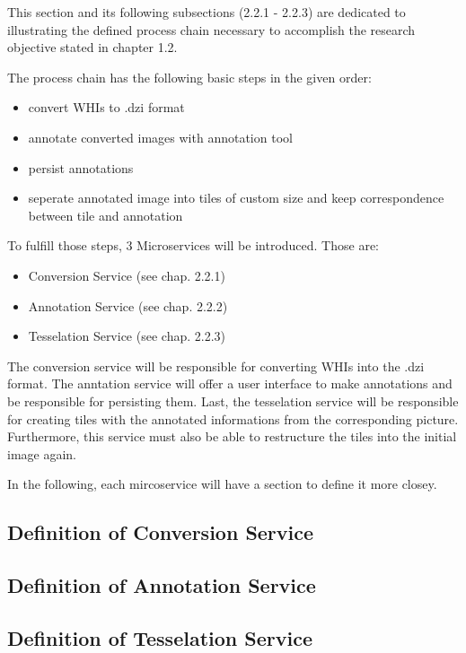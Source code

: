 This section and its following subsections (2.2.1 - 2.2.3) are dedicated to illustrating the defined process chain necessary to accomplish the research objective stated in chapter 1.2.

The process chain has the following basic steps in the given order:
\begin{itemize}
	\item convert WHIs to .dzi format
	\item annotate converted images with annotation tool
	\item persist annotations
	\item seperate annotated image into tiles of custom size and keep correspondence between tile and annotation
\end{itemize}

To fulfill those steps, 3 Microservices will be introduced. Those are:

\begin{itemize}
	\item Conversion Service (see chap. 2.2.1)
	\item Annotation Service (see chap. 2.2.2)
	\item Tesselation Service (see chap. 2.2.3)
\end{itemize}

The conversion service will be responsible for converting WHIs into the .dzi format. The anntation service will offer a user interface to make annotations and be responsible for persisting them. Last, the tesselation service will be responsible for creating tiles with the annotated informations from the corresponding picture. Furthermore, this service must also be able to restructure the tiles into the initial image again.

In the following, each mircoservice will have a section to define it more closey.


\subsection{Definition of Conversion Service}
\subsection{Definition of Annotation Service}
\subsection{Definition of Tesselation Service}